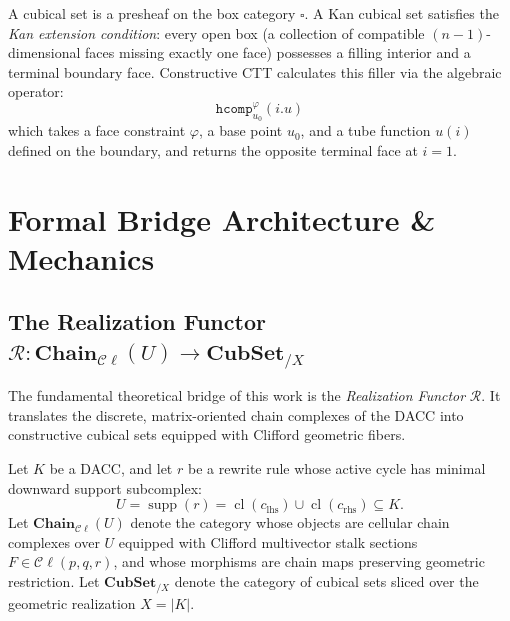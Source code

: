 \documentclass[acmsmall,screen,nonacm]{acmart}
\newcommand{\Cl}{\mathcal{C}\ell}
\newcommand{\Chain}{\mathbf{Chain}}
\newcommand{\CubSet}{\mathbf{CubSet}}
\newcommand{\Real}{\mathcal{R}}
\newcommand{\supp}{\operatorname{supp}}
\newcommand{\cl}{\operatorname{cl}}
\newcommand{\hcomp}{\texttt{hcomp}}
\begin{document}
A cubical set is a presheaf on the box category $\square$. A Kan cubical set satisfies the \emph{Kan extension condition}: every open box (a collection of compatible $(n-1)$-dimensional faces missing exactly one face) possesses a filling interior and a terminal boundary face. Constructive CTT calculates this filler via the algebraic operator:
\[
  \hcomp^\varphi_{u_0}(i. u)
\]
which takes a face constraint $\varphi$, a base point $u_0$, and a tube function $u(i)$ defined on the boundary, and returns the opposite terminal face at $i=1$.

\section{Formal Bridge Architecture \& Mechanics}
\label{sec:bridge-architecture}

\subsection{The Realization Functor \texorpdfstring{$\Real: \Chain_{\Cl}(U) \longrightarrow \CubSet_{/X}$}{R: Chain_Cl(U) -> CubSet_/X}}
\label{sec:functor-definition}

The fundamental theoretical bridge of this work is the \emph{Realization Functor} $\Real$. It translates the discrete, matrix-oriented chain complexes of the DACC into constructive cubical sets equipped with Clifford geometric fibers.

Let $K$ be a DACC, and let $r$ be a rewrite rule whose active cycle has minimal downward support subcomplex:
\[
  U = \supp(r) = \cl(c_\mathrm{lhs}) \cup \cl(c_\mathrm{rhs}) \subseteq K.
\]
Let $\Chain_{\Cl}(U)$ denote the category whose objects are cellular chain complexes over $U$ equipped with Clifford multivector stalk sections $F \in \Cl(p,q,r)$, and whose morphisms are chain maps preserving geometric restriction. Let $\CubSet_{/X}$ denote the category of cubical sets sliced over the geometric realization $X = |K|$.
\end{document}
